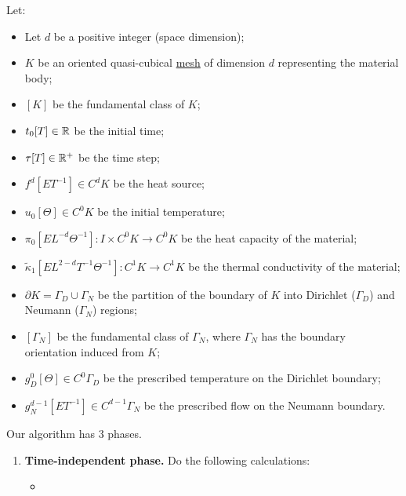 \begin{algorithm}
  \label{idec/heat_transport/discrete/primal_weak_transient_solve_trapezoidal-algorithm}
  Let:
  \begin{itemize}
    \item
      Let $d$ be a positive integer (space dimension);
    \item
      $K$ be an oriented quasi-cubical \hyperref[idec:mesh:definition]{mesh} of
      dimension $d$ representing the material body;
    \item
      $[K]$ be the fundamental class of $K$;
    \item
      $t_0 [T] \in \mathbb{R}$ be the initial time;
    \item
      $\tau [T] \in \mathbb{R}^+$ be the time step;
    \item
      $f^d [E T^{-1}] \in C^d K$ be the heat source;
    \item
      $u_0 [\Theta] \in C^0 K$ be the initial temperature;
    \item
      $\pi_0 [E L^{-d} \Theta^{-1}] \colon I \times C^0 K \to C^0 K$
      be the heat capacity of the material;
    \item
      $\tilde{\kappa}_1 [E L^{2 - d} T^{-1} \Theta^{-1}] \colon C^1 K \to C^1 K$
      be the thermal conductivity of the material;
    \item
      $\partial K = \Gamma_D \cup \Gamma_N$ be the partition of the boundary of
      $K$ into Dirichlet ($\Gamma_D$) and Neumann ($\Gamma_N$) regions;
    \item
      $[\Gamma_N]$ be the fundamental class of $\Gamma_N$, where $\Gamma_N$
      has the boundary orientation induced from $K$;
    \item
      $g_D^0 [\Theta] \in C^0 \Gamma_D$
      be the prescribed temperature on the Dirichlet boundary;
    \item
      $g_N^{d - 1} [E T^{-1}] \in C^{d - 1} \Gamma_N$
      be the prescribed flow on the Neumann boundary.
  \end{itemize}
  Our algorithm has $3$ phases.
  \begin{enumerate}
    \item
      \textbf{Time-independent phase.}
      Do the following calculations:
      \begin{itemize}
        \item

\end{itemize}
\end{enumerate}
\end{algorithm}
